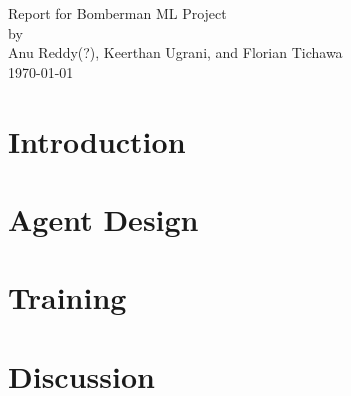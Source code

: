 \documentclass[12pt]{article}
\begin{document}

  \pagestyle{fancy}

  \thispagestyle{empty}
  \begin{center}
    \Large Report for Bomberman ML Project\\[2\baselineskip]
    by\\
    Anu Reddy(?), Keerthan Ugrani, and Florian Tichawa\\
    [2\baselineskip]
    \today\\
    \vfill
  \end{center}

  \pagebreak
  \tableofcontents

  \pagebreak
  \glsresetall
  \section{Introduction}
  \label{sec:intro}
  

  \section{Agent Design}
  \label{sec:design}
  

  \section{Training}
  \label{sec:training}
  

  \section{Discussion}
  \label{sec:discussion}
  

  \pagebreak
  \printglossaries

  \pagebreak
  \printbibliography
\end{document}
